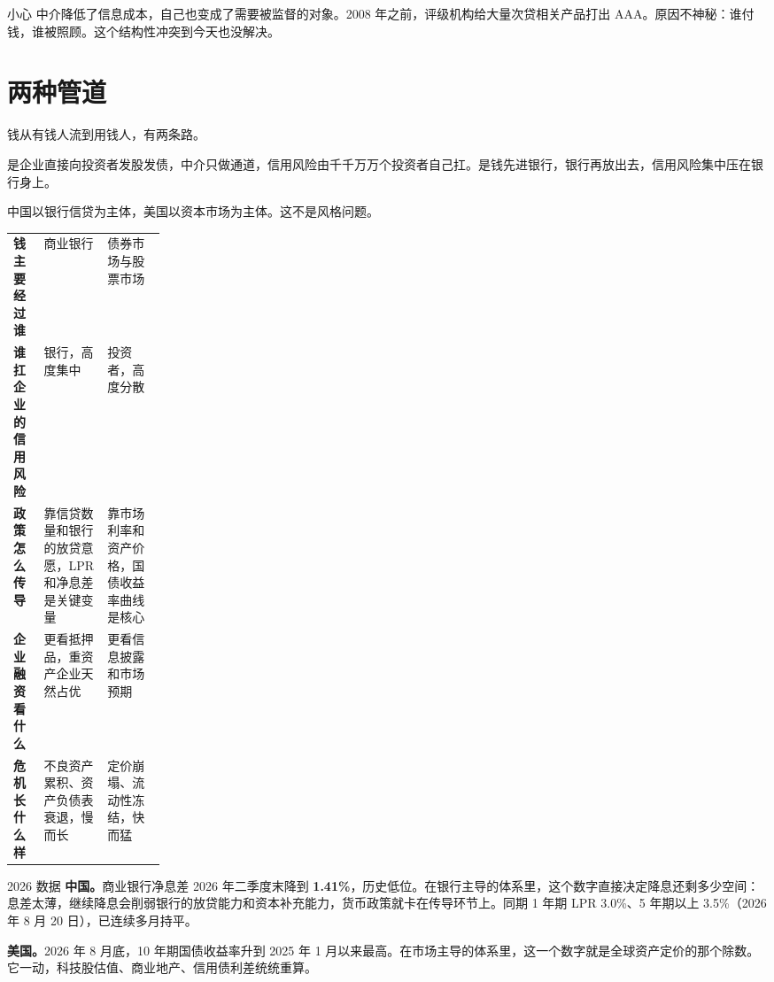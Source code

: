 \begin{warnbox}{小心}
中介降低了信息成本，自己也变成了需要被监督的对象。2008 年之前，评级机构给大量次贷相关产品打出 AAA。原因不神秘：谁付钱，谁被照顾。这个结构性冲突到今天也没解决。

\end{warnbox}

\section{两种管道}

钱从有钱人流到用钱人，有两条路。

是企业直接向投资者发股发债，中介只做通道，信用风险由千千万万个投资者自己扛。是钱先进银行，银行再放出去，信用风险集中压在银行身上。

中国以银行信贷为主体，美国以资本市场为主体。这不是风格问题。

\begin{tablewrap}
\begin{xltabular}{\linewidth}{>{\raggedright\arraybackslash}p{0.20\linewidth}XX}
\toprule
{} &  &  \\
\midrule
\textbf{钱主要经过谁} & 商业银行 & 债券市场与股票市场 \\
\textbf{谁扛企业的信用风险} & 银行，高度集中 & 投资者，高度分散 \\
\textbf{政策怎么传导} & 靠信贷数量和银行的放贷意愿，LPR 和净息差是关键变量 & 靠市场利率和资产价格，国债收益率曲线是核心 \\
\textbf{企业融资看什么} & 更看抵押品，重资产企业天然占优 & 更看信息披露和市场预期 \\
\textbf{危机长什么样} & 不良资产累积、资产负债表衰退，慢而长 & 定价崩塌、流动性冻结，快而猛 \\
\bottomrule
\end{xltabular}
\end{tablewrap}

\begin{databox}{2026 数据}
\textbf{中国。}商业银行净息差 2026 年二季度末降到 \textbf{1.41\%}，历史低位。在银行主导的体系里，这个数字直接决定降息还剩多少空间：息差太薄，继续降息会削弱银行的放贷能力和资本补充能力，货币政策就卡在传导环节上。同期 1 年期 LPR 3.0\%、5 年期以上 3.5\%（2026 年 8 月 20 日），已连续多月持平。

\textbf{美国。}2026 年 8 月底，10 年期国债收益率升到 2025 年 1 月以来最高。在市场主导的体系里，这一个数字就是全球资产定价的那个除数。它一动，科技股估值、商业地产、信用债利差统统重算。

\end{databox}


